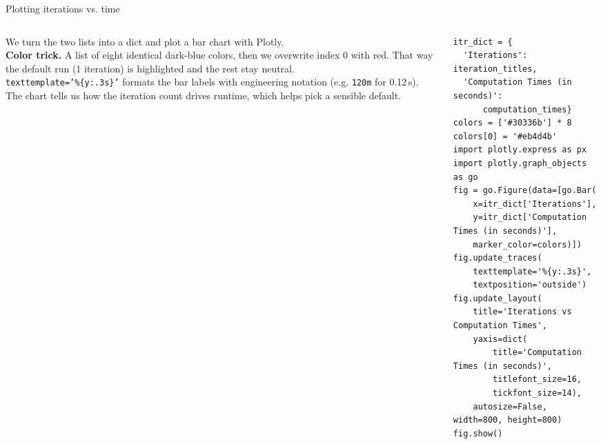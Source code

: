 \documentclass[10pt,aspectratio=169]{beamer}
\begin{document}
\begin{frame}[fragile]{Plotting iterations vs. time}
\begin{columns}[T,onlytextwidth]
\begin{column}{0.42\textwidth}
\small
We turn the two lists into a dict and plot a bar chart with Plotly.\\[0.4em]
\textbf{Color trick.} A list of eight identical dark-blue colors, then we overwrite index 0 with red. That way the default run (1 iteration) is highlighted and the rest stay neutral.\\[0.4em]
\texttt{texttemplate='\%\{y:.3s\}'} formats the bar labels with engineering notation (e.g. \texttt{120m} for 0.12\,s).\\[0.4em]
The chart tells us how the iteration count drives runtime, which helps pick a sensible default.
\end{column}
\begin{column}{0.56\textwidth}
\begin{lstlisting}[firstnumber=last]
itr_dict = {
  'Iterations': iteration_titles,
  'Computation Times (in seconds)':
      computation_times}
colors = ['#30336b'] * 8
colors[0] = '#eb4d4b'
import plotly.express as px
import plotly.graph_objects as go
fig = go.Figure(data=[go.Bar(
    x=itr_dict['Iterations'],
    y=itr_dict['Computation Times (in seconds)'],
    marker_color=colors)])
fig.update_traces(
    texttemplate='%{y:.3s}',
    textposition='outside')
fig.update_layout(
    title='Iterations vs Computation Times',
    yaxis=dict(
        title='Computation Times (in seconds)',
        titlefont_size=16,
        tickfont_size=14),
    autosize=False, width=800, height=800)
fig.show()
\end{lstlisting}
\end{column}
\end{columns}
\end{frame}
\end{document}
